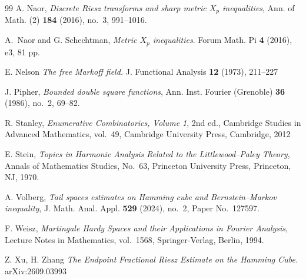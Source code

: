\documentclass{amsart}
\numberwithin{equation}{section}
\theoremstyle{definition}
\theoremstyle{remark}
\newcommand{\1}{\mathbf 1}
\begin{document}
\begin{thebibliography}{99}
A. Naor,
\emph{Discrete Riesz transforms and sharp metric $X_{p}$ inequalities},
Ann. of Math. (2) \textbf{184} (2016), no.~3, 991--1016.

A.~Naor and G. Schechtman, \emph{Metric $X_p$ inequalities}. Forum Math. Pi \textbf{4} (2016), e3, 81 pp. 

E. Nelson \emph{The free Markoff field.} J. Functional Analysis {\bf 12} (1973), 211--227

J. Pipher,
\emph{Bounded double square functions},
Ann. Inst. Fourier (Grenoble) \textbf{36} (1986), no.~2, 69--82.

R. Stanley,
\emph{Enumerative Combinatorics, Volume 1},
2nd ed., Cambridge Studies in Advanced Mathematics, vol.~49,
Cambridge University Press, Cambridge, 2012

E. Stein,
\emph{Topics in Harmonic Analysis Related to the Littlewood--Paley Theory},
Annals of Mathematics Studies, No.~63,
Princeton University Press, Princeton, NJ, 1970.

A. Volberg,
\emph{Tail spaces estimates on Hamming cube and Bernstein--Markov inequality},
J. Math. Anal. Appl. \textbf{529} (2024), no.~2, Paper No.~127597.

F. Weisz,
\emph{Martingale Hardy Spaces and their Applications in Fourier Analysis},
Lecture Notes in Mathematics, vol.~1568,
Springer-Verlag, Berlin, 1994.

 Z. Xu, H. Zhang {\it The Endpoint Fractional Riesz Estimate on the Hamming Cube.} arXiv:2609.03993 

\end{thebibliography}
\end{document}
